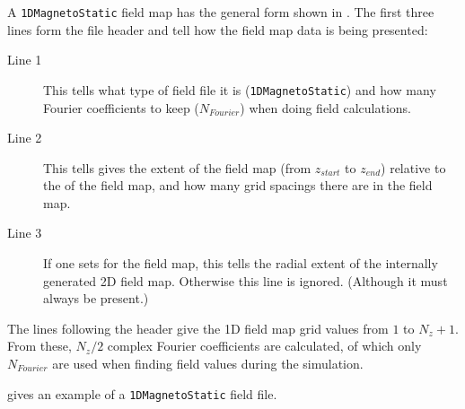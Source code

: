 A \texttt{1DMagnetoStatic} field map has the general form shown in . The first three lines form
the file header and tell \opalt how the field map data is being presented:

\begin{description}
\item[Line 1] This tells \opalt what type of field file it is (\texttt{1DMagnetoStatic}) and how many Fourier coefficients to
  keep ($N_{Fourier}$) when doing field calculations.
\item[Line 2] This tells gives the extent of the field map (from $z_{start}$ to $z_{end}$) relative to the  of
  the field map, and how many grid spacings there are in the field map.
\item[Line 3] If one sets  for the field map, this tells \opalt the radial extent of the internally
  generated 2D field map. Otherwise this line is ignored. (Although it must always be present.)
\end{description}

The lines following the header give the 1D field map grid values from $1$ to $N_{z} + 1$. From these, $N_{z}/2$
complex Fourier coefficients are calculated, of which only $N_{Fourier}$ are used when finding field values during the
simulation.

 gives an example of a \texttt{1DMagnetoStatic} field file.


